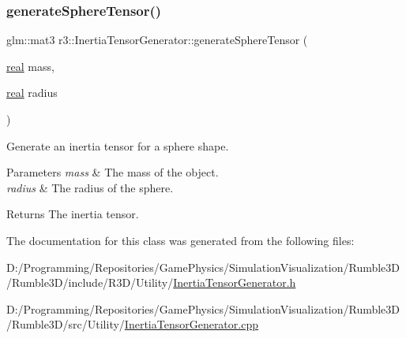 \subsubsection{\texorpdfstring{generate\+Sphere\+Tensor()}{generateSphereTensor()}}
{\footnotesize\ttfamily glm\+::mat3 r3\+::\+Inertia\+Tensor\+Generator\+::generate\+Sphere\+Tensor (\begin{DoxyParamCaption}\item[{\mbox{\hyperlink{namespacer3_ab2016b3e3f743fb735afce242f0dc1eb}{real}}}]{mass,  }\item[{\mbox{\hyperlink{namespacer3_ab2016b3e3f743fb735afce242f0dc1eb}{real}}}]{radius }\end{DoxyParamCaption})\hspace{0.3cm}{\ttfamily [static]}}



Generate an inertia tensor for a sphere shape. 


\begin{DoxyParams}{Parameters}
{\em mass} & The mass of the object. \\
\hline
{\em radius} & The radius of the sphere. \\
\hline
\end{DoxyParams}
\begin{DoxyReturn}{Returns}
The inertia tensor. 
\end{DoxyReturn}


The documentation for this class was generated from the following files\+:\begin{DoxyCompactItemize}
\item 
D\+:/\+Programming/\+Repositories/\+Game\+Physics/\+Simulation\+Visualization/\+Rumble3\+D/\+Rumble3\+D/include/\+R3\+D/\+Utility/\mbox{\hyperlink{_inertia_tensor_generator_8h}{Inertia\+Tensor\+Generator.\+h}}\item 
D\+:/\+Programming/\+Repositories/\+Game\+Physics/\+Simulation\+Visualization/\+Rumble3\+D/\+Rumble3\+D/src/\+Utility/\mbox{\hyperlink{_inertia_tensor_generator_8cpp}{Inertia\+Tensor\+Generator.\+cpp}}\end{DoxyCompactItemize}
